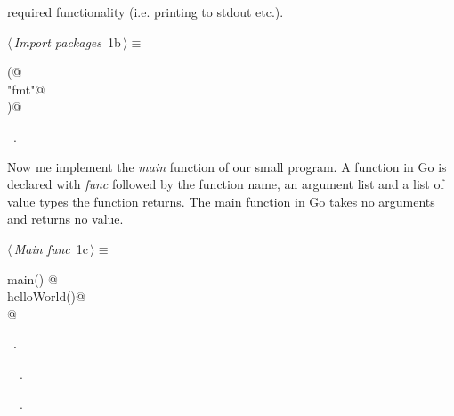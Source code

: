 \documentclass[a4paper]{report}
\begin{document}
required functionality (i.e. printing to stdout etc.).
\begin{flushleft} \small
\begin{minipage}{\linewidth}\label{scrap2}\raggedright\small
{} $\langle\,${\itshape Import packages}\nobreak\ {\footnotesize {1b}}$\,\rangle\equiv$
\vspace{-1ex}
\begin{list}{}{} \item
\mbox{}\lstinline@import (@\\
\mbox{}\lstinline@  "fmt"@\\
\mbox{}\lstinline@)@\\
\mbox{}\lstinline@@{\NWsep}
\end{list}
\vspace{-1.5ex}
\footnotesize
\begin{list}{}{\setlength{\itemsep}{-\parsep}\setlength{\itemindent}{-\leftmargin}}
\item \NWtxtMacroRefIn\ .

\item{}
\end{list}
\end{minipage}\vspace{4ex}
\end{flushleft}
Now me implement the \emph{main} function of our small program. A function in
Go is declared with \emph{func} followed by the function name, an argument
list and a list of value types the function returns. The main function in Go
takes no arguments and returns no value.
\begin{flushleft} \small
\begin{minipage}{\linewidth}\label{scrap3}\raggedright\small
{} $\langle\,${\itshape Main func}\nobreak\ {\footnotesize {1c}}$\,\rangle\equiv$
\vspace{-1ex}
\begin{list}{}{} \item
\mbox{}\lstinline@func main() {@\\
\mbox{}\lstinline@  helloWorld()@\\
\mbox{}\lstinline@}@\\
\mbox{}\lstinline@@{\NWsep}
\end{list}
\vspace{-1.5ex}
\footnotesize
\begin{list}{}{\setlength{\itemsep}{-\parsep}\setlength{\itemindent}{-\leftmargin}}
\item \NWtxtMacroRefIn\ .
\item \NWtxtIdentsDefed\nobreak\  \verb@main@\nobreak\ .\item \NWtxtIdentsUsed\nobreak\  \verb@helloWorld@\nobreak\ .
\item{}
\end{list}
\end{minipage}\vspace{4ex}
\end{flushleft}
\end{document}

